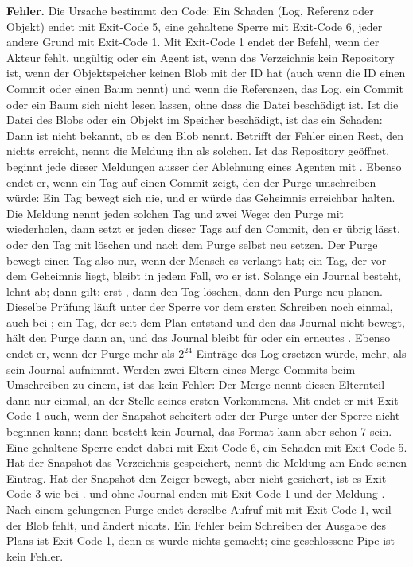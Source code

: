 {\bf Fehler.} Die Ursache bestimmt den Code: Ein Schaden (Log, Referenz oder Objekt) endet mit
Exit-Code 5, eine gehaltene Sperre mit Exit-Code 6, jeder andere Grund mit Exit-Code 1.
Mit Exit-Code 1 endet der Befehl, wenn der Akteur fehlt, ungültig oder ein
Agent ist, wenn das Verzeichnis kein Repository ist, wenn der Objektspeicher keinen Blob mit
der ID hat (auch wenn die ID einen Commit oder einen Baum nennt)
und wenn die Referenzen, das Log, ein Commit oder ein Baum sich nicht lesen lassen,
ohne dass die Datei beschädigt ist.
Ist die Datei des Blobs oder ein Objekt im Speicher beschädigt, ist das ein Schaden:
Dann ist nicht bekannt, ob es den Blob nennt.
Betrifft der Fehler einen Rest, den nichts erreicht, nennt die Meldung ihn als solchen.
Ist das Repository geöffnet, beginnt jede dieser Meldungen ausser der Ablehnung eines Agenten
mit .
Ebenso endet er, wenn ein Tag auf einen Commit zeigt, den der Purge umschreiben würde:
Ein Tag bewegt sich nie, und er würde das Geheimnis erreichbar halten.
Die Meldung nennt jeden solchen Tag und zwei Wege: den Purge mit  wiederholen,
dann setzt er jeden dieser Tags auf den Commit, den er übrig lässt, oder den Tag mit
 löschen und nach dem Purge selbst neu setzen.
Der Purge bewegt einen Tag also nur, wenn der Mensch es verlangt hat; ein Tag, der vor dem
Geheimnis liegt, bleibt in jedem Fall, wo er ist.
Solange ein Journal besteht, lehnt  ab; dann gilt:
erst , dann den Tag löschen, dann den Purge neu planen.
Dieselbe Prüfung läuft unter der Sperre vor dem ersten Schreiben noch einmal,
auch bei ; ein Tag, der seit dem Plan entstand und den das Journal nicht
bewegt, hält den Purge dann an, und das Journal bleibt für  oder ein
erneutes .
Ebenso endet er, wenn der Purge mehr als $2^{24}$ Einträge des Log ersetzen würde, mehr, als
sein Journal aufnimmt.
Werden zwei Eltern eines Merge-Commits beim Umschreiben zu einem, ist das kein Fehler:
Der Merge nennt diesen Elternteil dann nur einmal, an der Stelle seines ersten Vorkommens.
Mit  endet er mit Exit-Code 1 auch, wenn der Snapshot scheitert oder der Purge
unter der Sperre nicht beginnen kann; dann besteht kein Journal, das Format kann aber schon 7
sein. Eine gehaltene Sperre endet dabei mit Exit-Code 6, ein Schaden mit Exit-Code 5.
Hat der Snapshot das Verzeichnis gespeichert,
nennt die Meldung am Ende seinen Eintrag. Hat der Snapshot den Zeiger bewegt, aber nicht
gesichert, ist es Exit-Code 3 wie bei .  und  ohne Journal
enden mit Exit-Code 1 und der Meldung .
Nach einem gelungenen Purge endet derselbe Aufruf mit  mit Exit-Code 1,
weil der Blob fehlt, und ändert nichts.
Ein Fehler beim Schreiben der Ausgabe des Plans ist Exit-Code 1, denn es wurde nichts gemacht;
eine geschlossene Pipe ist kein Fehler.

